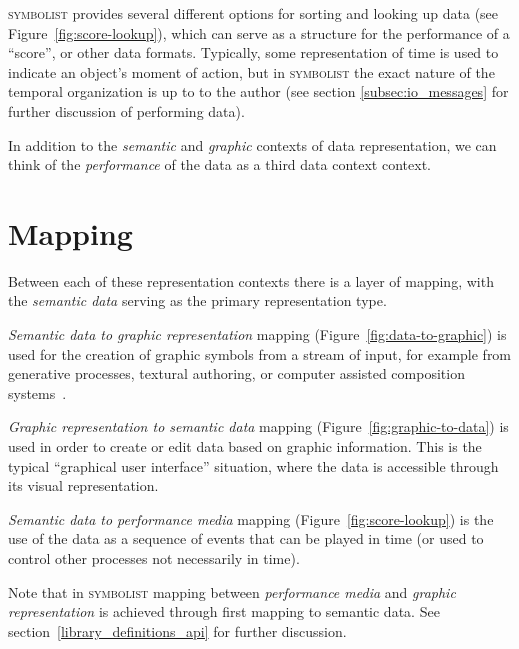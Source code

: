 \documentclass{article}
\def\symbolist{\textsc{symbolist}\xspace}
\begin{document}
\symbolist provides several different options for sorting and looking up data (see Figure~\ref{fig:score-lookup}), which can serve as a structure for the performance of a ``score'', or other data formats. Typically, some representation of time is used to indicate an object's moment of action, but in \symbolist the exact nature of the temporal organization is up to to the author (see section \ref{subsec:io_messages} for further discussion of performing data). 

In addition to the \textit{semantic} and \textit{graphic} contexts of data representation, we can think of the \textit{performance} of the data as a third data context context.

\section{Mapping}\label{sec:mapping}

Between each of these representation contexts there is a layer of mapping, with the \textit{semantic data} serving as the primary representation type. 

\textit{Semantic data to graphic representation} mapping (Figure~\ref{fig:data-to-graphic}) is used for the creation of graphic symbols from a stream of input, for example from generative processes, textural authoring, or computer assisted composition systems~\cite{bresson2011om, didkovsky2008maxscore, agostini2015max, baca2015abjad, burloiu2017visual}.

\textit{Graphic representation to semantic data} mapping (Figure~\ref{fig:graphic-to-data}) is used in order to create or edit data based on graphic information. This is the typical ``graphical user interface'' situation, where the data is accessible through its visual representation.

\textit{Semantic data to performance media} mapping (Figure~\ref{fig:score-lookup}) is the use of the data as a sequence of events that can be played in time (or used to control other processes not necessarily in time).

Note that in \symbolist mapping between \textit{performance media} and \textit{graphic representation} is achieved through first mapping to semantic data. See section~\ref{library_definitions_api} for further discussion.


\end{document}
